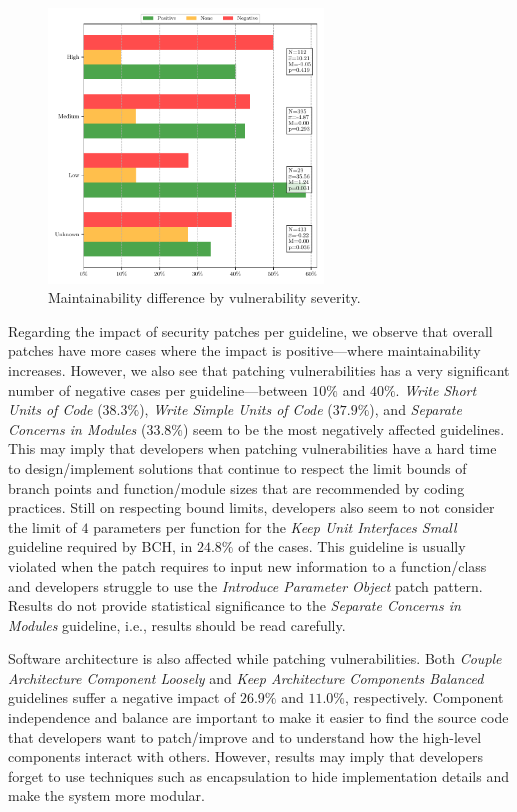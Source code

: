 \documentclass[smallextended]{svjour3}       %
\begin{document}
 \begin{figure}[htp]
  	\centering 	 	\includegraphics[width=0.65\textwidth]{figures/main_per_severity.pdf}
  	\caption{Maintainability difference by vulnerability severity.}
 	\label{fig:severity}
 \end{figure}

Regarding the impact of security patches per guideline, we 
observe that overall patches have more cases where the impact is 
positive---where maintainability increases. However, we also 
see that patching vulnerabilities has a very significant number of 
negative cases per guideline---between $10\%$ and $40\%$. 
\emph{Write Short Units of Code} ($38.3\%$), \emph{Write Simple 
Units of Code} ($37.9\%$), and \emph{Separate Concerns in Modules} 
($33.8\%$) seem to be the most negatively affected guidelines. This 
may imply that developers when patching vulnerabilities have a hard 
time to design/implement solutions that continue to respect the 
limit bounds of branch points and function/module sizes that are 
recommended by coding practices. Still on respecting bound limits, 
developers also seem to not consider the limit of $4$ parameters per 
function for the \emph{Keep Unit Interfaces Small} guideline 
required by BCH, in $24.8\%$ of the cases. This guideline is usually
violated when the patch requires to input new information to a 
function/class and developers struggle to use the \emph{Introduce 
Parameter Object} patch pattern. Results do not provide statistical 
significance to the \emph{Separate Concerns in Modules} guideline, 
i.e., results should be read carefully. 

Software architecture is also affected while patching 
vulnerabilities. Both \emph{Couple Architecture Component Loosely} 
and \emph{Keep Architecture Components Balanced} guidelines suffer a 
negative impact of $26.9\%$ and $11.0\%$, respectively. Component 
independence and balance are important to make it easier to find the 
source code that developers want to patch/improve and to understand 
how the high-level components interact with others. However, results 
may imply that developers forget to use techniques such as 
encapsulation to hide implementation details and make the system 
more modular.
\end{document}
